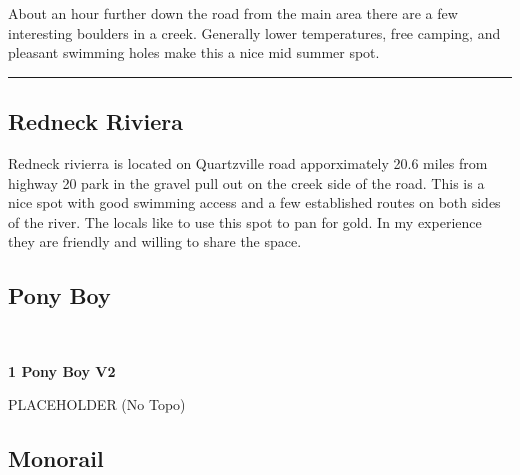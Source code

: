 \begin{multicols}{2}
\begin{minipage}{\columnwidth}
About an hour further down the road from the main area there are a few interesting boulders in a creek. Generally lower temperatures, free camping, and pleasant swimming holes make this a nice mid summer spot.
\end{minipage}

\end{multicols}
\rule{\textwidth}{1pt}
\begin{multicols}{2}
		\section{Redneck Riviera}\label{sa:Redneck Riviera}
	\begin{minipage}{\columnwidth}
	Redneck rivierra is located on Quartzville road apporximately 20.6 miles from highway 20 park in the gravel pull out on the creek side of the road. This is a nice spot with good swimming access and a few established routes on both sides of the river. The locals like to use this spot to pan for gold. In my experience they are friendly and willing to share the space.
	\end{minipage}
			\subsection*{Pony Boy}\label{bf:Pony Boy}
			\begin{minipage}{\columnwidth}
			\
			\end{minipage}
			
					\begin{minipage}{\linewidth}	
					\label{rt:Pony Boy}
\colorbox{green!20}{
\textbf{
1 Pony Boy V2  
}
}

					\begin{adjustwidth}{0.5cm}{}				
					PLACEHOLDER
						\newline (No Topo) 
					\end{adjustwidth}
					\end{minipage}
			\subsection*{Monorail}\label{bf:Monorail}
			\begin{minipage}{\columnwidth}
			\
			\end{minipage}
			

\end{multicols}
